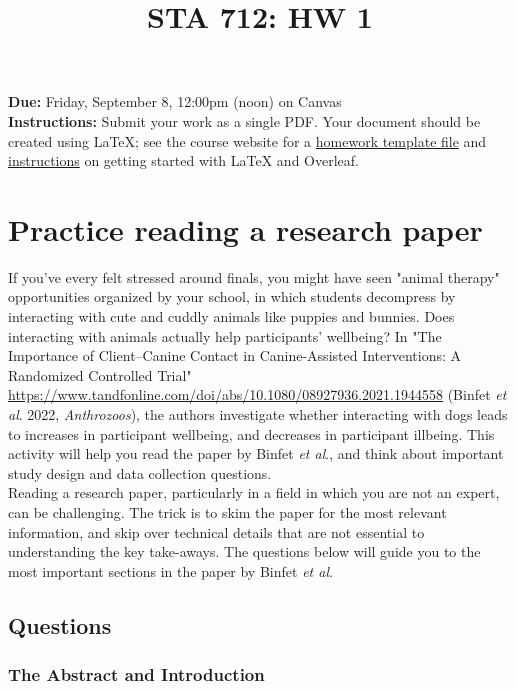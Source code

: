 \documentclass[12pt]{article}
\title{STA 712: HW 1}
\author{}
\date{}
\begin{document}
\maketitle

\noindent \textbf{Due:} Friday, September 8, 12:00pm (noon) on Canvas\\

\noindent \textbf{Instructions:} Submit your work as a single PDF. Your document should be created using LaTeX; see the course website for a \href{sta712-f23.github.io/homework/hw_template.tex}{homework template file} and \href{https://sta712-f23.github.io/homework/latex_instructions/}{instructions} on getting started with LaTeX and Overleaf.

\section{Practice reading a research paper}

If you've every felt stressed around finals, you might have seen "animal therapy" opportunities organized by your school, in which students decompress by interacting with cute and cuddly animals like puppies and bunnies. Does interacting with animals actually help participants' wellbeing? In "The Importance of Client–Canine Contact in Canine-Assisted Interventions: A Randomized Controlled Trial" \url{https://www.tandfonline.com/doi/abs/10.1080/08927936.2021.1944558} (Binfet \textit{et al}. 2022, \textit{Anthrozoos}), the authors investigate whether interacting with dogs leads to increases in participant wellbeing, and decreases in participant illbeing. This activity will help you read the paper by Binfet \textit{et al}., and think about important study design and data collection questions.\\

\noindent Reading a research paper, particularly in a field in which you are not an expert, can be challenging. The trick is to skim the paper for the most relevant information, and skip over technical details that are not essential to understanding the key take-aways. The questions below will guide you to the most important sections in the paper by Binfet \textit{et al}.

\subsection*{Questions}

\subsubsection*{The Abstract and Introduction}
\end{document}
